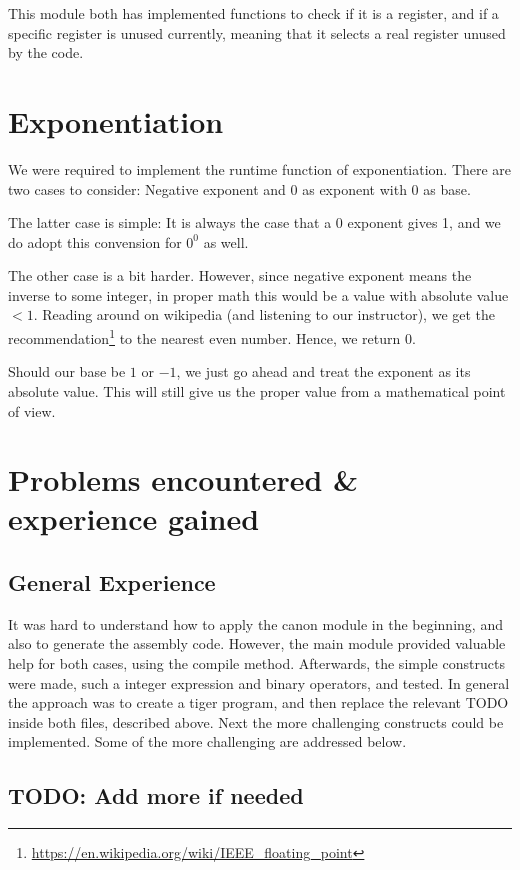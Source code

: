 \documentclass{article}
\begin{document}
This module both has implemented functions to check if it is a register, and if a specific register is unused currently, meaning that it selects a real register unused by the code.

\section{Exponentiation}
We were required to implement the runtime function of exponentiation. There are two cases to consider: Negative exponent and 0 as exponent with 0 as base.

The latter case is simple: It is always the case that a 0 exponent gives 1, and we do adopt this convension for $0^0$ as well.

The other case is a bit harder. However, since negative exponent means the inverse to some integer, in proper math this would be a value with absolute value $ < 1$. Reading around on wikipedia (and listening to our instructor), we get the recommendation\footnote{\url{https://en.wikipedia.org/wiki/IEEE_floating_point}} to the nearest even number. Hence, we return 0.

Should our base be $1$ or $-1$, we just go ahead and treat the exponent as its absolute value. This will still give us the proper value from a mathematical point of view.

\section{Problems encountered \& experience gained}

\subsection{General Experience}
It was hard to understand how to apply the canon module in the beginning, and also to generate the assembly code. However, the main module provided valuable help for both cases, using the compile method. Afterwards, the simple constructs were made, such a integer expression and binary operators, and tested. In general the approach was to create a tiger program, and then replace the relevant TODO inside both files, described above.
Next the more challenging constructs could be implemented. Some of the more challenging are addressed below.  

\subsection{TODO: Add more if needed}
\end{document}
